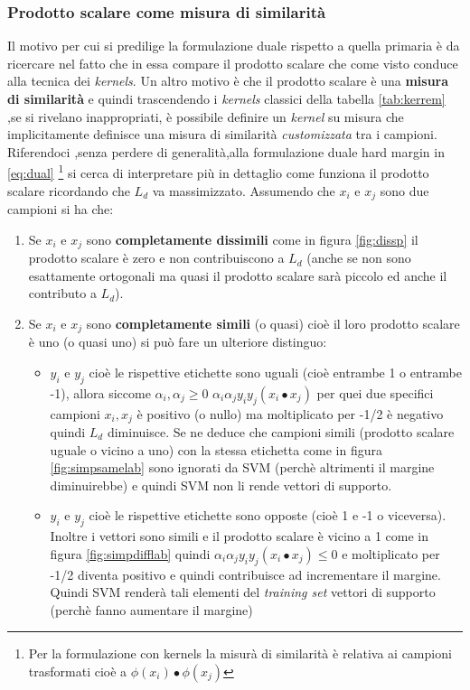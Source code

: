 \subsubsection{Prodotto scalare come misura di similarità}
\label{subsub:prscal}
Il motivo per cui si predilige la formulazione duale rispetto a quella primaria è da ricercare nel fatto che in essa compare il prodotto scalare che come visto conduce alla tecnica dei \textit{kernels}. Un altro motivo è che il prodotto scalare è una \textbf{misura di similarità} e quindi trascendendo i \textit{kernels} classici della tabella \ref{tab:kerrem} ,se si rivelano inappropriati, è possibile definire un \textit{kernel} su misura che implicitamente definisce una misura di similarità \textit{customizzata} tra i campioni. Riferendoci ,senza perdere di generalità,alla formulazione duale hard margin in \eqref{eq:dual} \footnote{Per la formulazione con kernels la misurà di similarità è relativa ai campioni trasformati cioè a $\phi(x_i) \bullet \phi(x_j)$} si cerca di interpretare più in dettaglio come funziona il prodotto scalare ricordando che $L_d$ va massimizzato. Assumendo che $x_i$ e $x_j$ sono due campioni  si ha che:
\begin{enumerate}
\item Se $x_i \text{ e } x_j$ sono \textbf{completamente dissimili} come in figura \ref{fig:dissp} il prodotto scalare è zero e non contribuiscono a $L_d$ (anche se non sono esattamente ortogonali ma quasi il prodotto scalare sarà piccolo ed anche il contributo a $L_d$).
\item Se $x_i \text{ e } x_j$ sono \textbf{completamente simili} (o quasi) cioè il loro prodotto scalare è uno (o quasi uno) si può fare un ulteriore distinguo:
\begin{itemize}
\item $y_i \text{ e } y_j$ cioè le rispettive etichette sono uguali (cioè entrambe 1 o entrambe -1), allora siccome $\alpha_i,\alpha_j \geq 0$ $\alpha_i\alpha_jy_iy_j(x_i \bullet x_j)$ per quei due specifici campioni $x_i,x_j$ è positivo (o nullo) ma moltiplicato per -1/2 è negativo quindi $L_d$ diminuisce. Se ne deduce che campioni simili (prodotto scalare uguale o vicino a uno) con la stessa etichetta come in figura \ref{fig:simpsamelab} sono ignorati da \ac{SVM} (perchè altrimenti il margine diminuirebbe) e quindi \ac{SVM} non li rende vettori di supporto.
\item $y_i \text{ e } y_j$ cioè le rispettive etichette sono opposte (cioè 1 e -1 o viceversa). Inoltre i vettori sono simili e il prodotto scalare è vicino a 1 come in figura \ref{fig:simpdifflab} quindi $\alpha_i\alpha_jy_iy_j(x_i \bullet x_j) \leq 0$ e moltiplicato per -1/2 diventa positivo e quindi contribuisce ad incrementare il margine. Quindi \ac{SVM} renderà tali elementi del \textit{training set} vettori di supporto (perchè fanno aumentare il margine) 
\end{itemize}
\end{enumerate}

